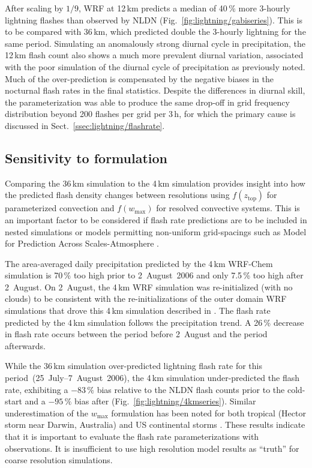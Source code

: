 After scaling by $1/9$, WRF at 12\,\unit{km} predicts a median of 40\,{\%}
more 3-hourly lightning flashes than observed by NLDN
(Fig.~\ref{fig:lightning/gabiseries}). This is to be compared with 36\,\unit{km}, which
predicted double the 3-hourly lightning for the same period. Simulating an
anomalously strong diurnal cycle in precipitation, the 12\,\unit{km} flash
count also shows a much more prevalent diurnal variation, associated with the
poor simulation of the diurnal cycle of precipitation as previously noted.
Much of the over-prediction is compensated by the negative biases in the
nocturnal flash rates in the final statistics. Despite the differences in
diurnal skill, the parameterization was able to produce the same drop-off in
grid frequency distribution beyond 200 flashes per grid per 3\,h, for which
the primary cause is discussed in Sect.~\ref{ssec:lightning/flashrate}.

\subsection{Sensitivity to formulation}\label{ssec:lightning/formsens}

Comparing the 36\,\unit{km} simulation to the 4\,\unit{km} simulation
provides insight into how the predicted flash density changes between
resolutions using $f(z_{\mathrm{top}})$ for parameterized convection and
$f(w_{\max})$ for resolved convective systems. This is an important factor to
be considered if flash rate predictions are to be included in nested
simulations or models permitting non-uniform grid-spacings such as Model for
Prediction Across Scales-Atmosphere \citep[MPAS-A;][]{Skamarock:2012fk}.

The area-averaged daily precipitation predicted by the 4\,\unit{km} WRF-Chem
simulation is 70\,{\%} too high prior to 2~August~2006 and only 7.5\,{\%} too high
after 2~August. On 2~August, the 4\,\unit{km} WRF simulation was
re-initialized (with no clouds) to be consistent with the re-initializations
of the outer domain WRF simulations that drove this 4\,\unit{km} simulation
described in \cite{Barth:2012qf}. The flash rate predicted by the
4\,\unit{km} simulation follows the precipitation trend. A 26\,{\%} decrease
in flash rate occurs between the period before 2~August and the period
afterwards.

While the 36\,\unit{km} simulation over-predicted lightning flash rate for
this period~(25~July--7~August~2006), the 4\,\unit{km} simulation
under-predicted the flash rate, exhibiting a $-83\,{\%}$ bias relative to the
NLDN flash counts prior to the cold-start and a $-95\,{\%}$ bias after
(Fig.~\ref{fig:lightning/4kmseries}). Similar underestimation of the $w_{\max}$
formulation has been noted for both tropical (Hector storm near Darwin,
Australia) and US continental storms \citep{Cummings:2012ly}. These results
indicate that it is important to evaluate the flash rate parameterizations
with observations. It is insufficient to use high resolution model results as
``truth'' for coarse resolution simulations.

